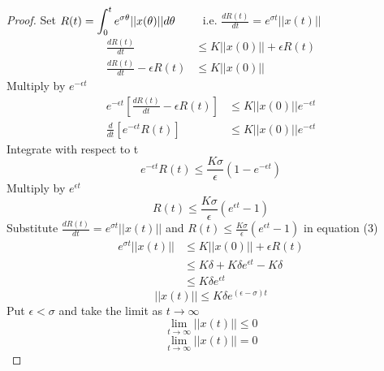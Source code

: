 \begin{proof}[\textcolor{theme}{Proof}]
    Set $\displaystyle R(t) = \int_{0}^{t} e^{\sigma \theta} ||x(\theta)|| d \theta \quad\quad$ i.e. $\displaystyle \frac{dR(t)}{dt} = e^{\sigma t} ||x(t)||$
    \begin{align*}
        \frac{dR(t)}{dt}                  & \leq K ||x(0)|| + \epsilon R(t) \tag{3}
        \\
        \frac{dR(t)}{dt}  - \epsilon R(t) & \leq K ||x(0)||
    \end{align*}
    Multiply by $e^{- \epsilon t}$
    \begin{align*}
        e^{- \epsilon t} \left[\frac{dR(t)}{dt}  - \epsilon R(t)\right] & \leq K ||x(0)|| e^{- \epsilon t}
        \\
        \frac{d}{dt}\left[ e^{- \epsilon t} R(t)\right]                 & \leq K ||x(0)|| e^{- \epsilon t}
    \end{align*}
    Integrate with respect to t
    \[
        e^{- \epsilon t} R(t) \leq \frac{K \sigma}{\epsilon}  (1- e^{- \epsilon t})
    \]
    Multiply by $e^{\epsilon t}$
    \[
        R(t) \leq \frac{K \sigma}{\epsilon}  (e^{\epsilon t} - 1)
    \]
    Substitute $\displaystyle \frac{dR(t)}{dt} = e^{\sigma t} ||x(t)||$ and $\displaystyle R(t) \leq \frac{K \sigma}{\epsilon}  (e^{\epsilon t} - 1)$ in equation (3)
    \begin{align*}
        e^{\sigma t}||x(t)|| & \leq K||x(0)|| + \epsilon R(t)
        \\
                             & \leq K \delta + K \delta e^{\epsilon t} - K \delta
        \\
                             & \leq K \delta e^{\epsilon t}
    \end{align*}
    \[
        ||x(t)|| \leq K \delta e^{(\epsilon-\sigma) t}
    \]
    Put $\epsilon < \sigma$ and take the limit as $t \to \infty$
    \[
        \lim_{t \to \infty} ||x(t)|| \leq 0
    \]
    \[
        \lim_{t \to \infty} ||x(t)|| = 0
    \]
\end{proof}

